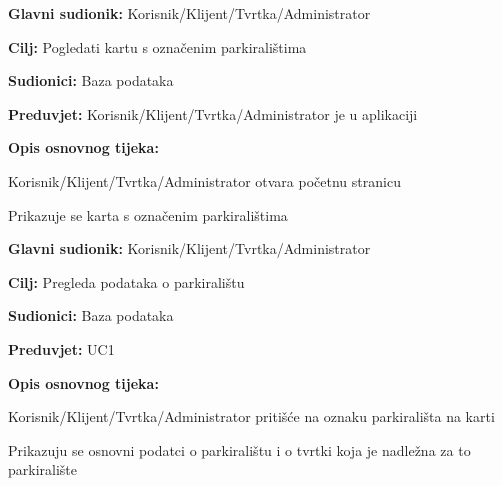\noindent {}
\begin{packed_item}
	
	\item \textbf{Glavni sudionik: } Korisnik/Klijent/Tvrtka/Administrator
	\item \textbf{Cilj:} Pogledati kartu s označenim parkiralištima
	\item \textbf{Sudionici:} Baza podataka
	\item \textbf{Preduvjet:} Korisnik/Klijent/Tvrtka/Administrator je u aplikaciji
	\item \textbf{Opis osnovnog tijeka:}
	
	\item[] \begin{packed_enum}
		
		\item Korisnik/Klijent/Tvrtka/Administrator otvara početnu stranicu
		\item Prikazuje se karta s označenim parkiralištima

	\end{packed_enum}
	
\end{packed_item}

\noindent {}
\begin{packed_item}
	
	\item \textbf{Glavni sudionik:} Korisnik/Klijent/Tvrtka/Administrator
	\item \textbf{Cilj:} Pregleda podataka o parkiralištu
	\item \textbf{Sudionici:} Baza podataka
	\item \textbf{Preduvjet:} UC1
	\item \textbf{Opis osnovnog tijeka:}
	
	\item[] \begin{packed_enum}
		
		\item Korisnik/Klijent/Tvrtka/Administrator pritišće na oznaku parkirališta na karti
		\item Prikazuju se osnovni podatci o parkiralištu i o tvrtki koja je nadležna za to parkiralište

	\end{packed_enum}
\end{packed_item}

\pagebreak


